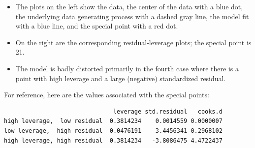 \documentclass[residuals.tex]{subfiles}
\begin{document}
\begin{itemize}
\item The plots on the left show the data, the center of the data  with a blue dot, the underlying data generating process with a dashed gray line, the model fit with a blue line, and the special point with a red dot. 
\item On the right are the corresponding residual-leverage plots; the special point is 21. 
\item The model is badly distorted primarily in the fourth case where there is a point with high leverage and a large (negative) standardized residual. 

\end{itemize}

For reference, here are the values associated with the special points:
\begin{verbatim}
                               leverage std.residual   cooks.d
high leverage,  low residual  0.3814234    0.0014559 0.0000007
low leverage,  high residual  0.0476191    3.4456341 0.2968102
high leverage, high residual  0.3814234   -3.8086475 4.4722437
\end{verbatim}
\end{document}
